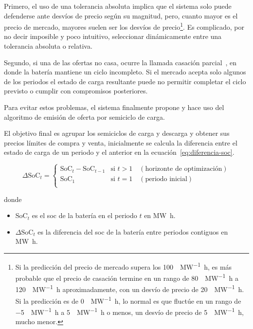 Primero, el uso de una tolerancia absoluta implica que el sistema solo puede defenderse ante desvíos de precio según su magnitud, pero, cuanto mayor es el precio de mercado, mayores suelen ser los desvíos de precio\footnote{Si la predicción del precio de mercado supera los \SI{100}{\text{\euro}\per\mega\watt\hour}, es más probable que el precio de casación termine en un rango de \SI{80}{\text{\euro}\per\mega\watt\hour} a \SI{120}{\text{\euro}\per\mega\watt\hour} aproximadamente, con un desvío de precio de \SI{20}{\text{\euro}\per\mega\watt\hour}. Si la predicción es de \SI{0}{\text{\euro}\per\mega\watt\hour}, lo normal es que fluctúe en un rango de \SI{-5}{\text{\euro}\per\mega\watt\hour} a \SI{5}{\text{\euro}\per\mega\watt\hour} o menos, un desvío de precio de \SI{5}{\text{\euro}\per\mega\watt\hour}, mucho menor.}. Es complicado, por no decir imposible y poco intuitivo, seleccionar dinámicamente entre una tolerancia absoluta o relativa.

Segundo, si una de las ofertas no casa, ocurre la llamada casación parcial~\cite{cnmc2024mercados}, en donde la batería mantiene un ciclo incompleto. Si el mercado acepta solo algunos de los periodos el estado de carga resultante puede no permitir completar el ciclo previsto o cumplir con compromisos posteriores.

Para evitar estos problemas, el sistema finalmente propone y hace uso del algoritmo de emisión de oferta por semiciclo de carga.

El objetivo final es agrupar los semiciclos de carga y descarga y obtener sus precios límites de compra y venta, inicialmente se calcula la diferencia entre el estado de carga de un periodo y el anterior en la ecuación~\ref{eq:diferencia-soc}.

\begin{samepage}

  \begin{equation}%
    \label{eq:diferencia-soc}
    \Delta \mathrm{SoC}_{t} =
    \begin{cases}
      \mathrm{SoC}_{t} - \mathrm{SoC}_{t - 1} & \text{si } t > 1 \quad (\text{horizonte de optimización}) \\
      \mathrm{SoC}_{1}                        & \text{si } t = 1 \quad (\text{periodo inicial})           \\
    \end{cases}
  \end{equation}

  donde

  \begin{itemize}

    \item \( \mathrm{SoC}_{t} \) es el \gls{soc} de la batería en el periodo \( t \) en \si{{\mega\watt\hour}}.

    \item \( \Delta \mathrm{SoC}_{t} \) es la diferencia del \gls{soc} de la batería entre periodos contiguos en \si{{\mega\watt\hour}}.

  \end{itemize}

\end{samepage}

